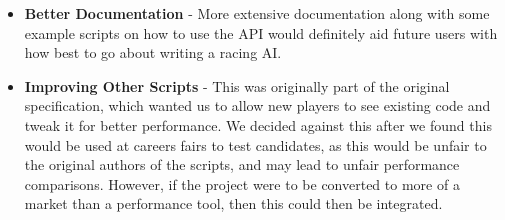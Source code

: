 \begin{itemize}
    \item
        \textbf{Better Documentation} - More extensive documentation along with some example scripts on how to use the API would definitely aid future users with how best to go about writing a racing AI.
    \item
        \textbf{Improving Other Scripts} - This was originally part of the original specification, which wanted us to allow new players to see existing code and tweak it for better performance. We decided against this after we found this would be used at careers fairs to test candidates, as this would be unfair to the original authors of the scripts, and may lead to unfair performance comparisons. However, if the project were to be converted to more of a market than a performance tool, then this could then be integrated.
\end{itemize}
